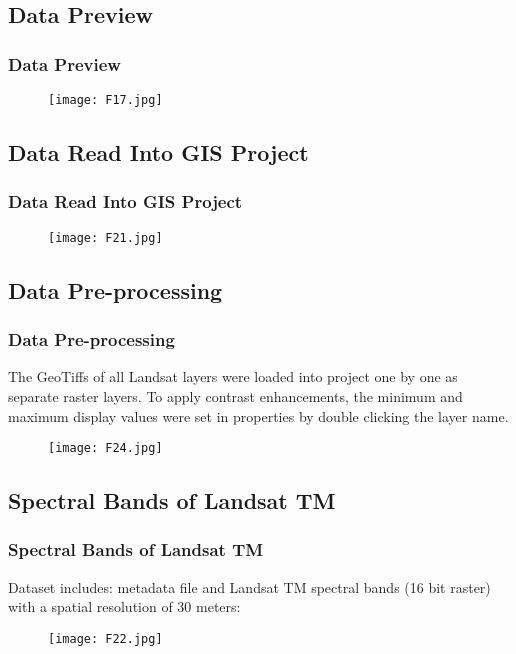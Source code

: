 \documentclass[pdflatex,compress,8pt,
	xcolor={dvipsnames,dvipsnames,svgnames,x11names,table},
	hyperref={
	breaklinks = true, 
	pdfauthor={Lemenkova Polina}, 
	pdfsubject={Preentation}, 
	pdfcreator={Lemenkova Polina}, 
	pdfproducer={Lemenkova Polina}, 
	colorlinks=true,linkcolor=blue, 
	citecolor=NavyBlue, 
	urlcolor = NavyBlue, 
	breaklinks = true}]{beamer}
\begin{document}
\subsection{Data Preview}
\begin{frame}\frametitle{Data Preview}
\begin{figure}[H]
	\centering
		\texttt{[image: F17.jpg]}
\end{figure}
\end{frame}

\subsection{Data Read Into GIS Project}
\begin{frame}\frametitle{Data Read Into GIS Project}
\begin{figure}[H]
	\centering
		\texttt{[image: F21.jpg]}
\end{figure}
\end{frame}

\subsection{Data Pre-processing}
\begin{frame}\frametitle{Data Pre-processing}
The GeoTiffs of all Landsat layers were loaded into project one by one as separate raster layers.
To apply contrast enhancements, the minimum and maximum display values were set in properties by double clicking the layer name.
\begin{figure}[H]
	\centering
		\texttt{[image: F24.jpg]}
\end{figure}
\end{frame}

\subsection{Spectral Bands of Landsat TM}
\begin{frame}\frametitle{Spectral Bands of Landsat TM}
Dataset includes: metadata file and Landsat TM spectral bands (16 bit raster) with a spatial resolution of 30 meters:
\begin{figure}[H]
	\centering
		\texttt{[image: F22.jpg]}
\end{figure}
\end{frame}
\end{document}
